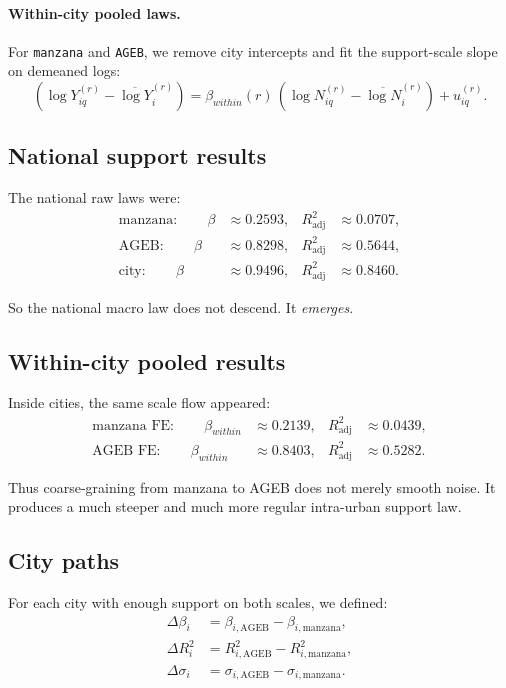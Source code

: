 \documentclass[11pt]{article}
\newcommand{\adjR}{R^2_{\mathrm{adj}}}
\begin{document}
\paragraph{Within-city pooled laws.}
For \texttt{manzana} and \texttt{AGEB}, we remove city intercepts and fit the support-scale slope on demeaned logs:
\begin{equation}
(\log Y_{iq}^{(r)}-\overline{\log Y}_{i}^{(r)})
=
\beta_{within}(r)\,(\log N_{iq}^{(r)}-\overline{\log N}_{i}^{(r)}) + u_{iq}^{(r)}.
\end{equation}

\subsection{National support results}

The national raw laws were:
\begin{align}
\text{manzana}: \qquad
\beta &\approx 0.2593,
&
\adjR &\approx 0.0707,
\\
\text{AGEB}: \qquad
\beta &\approx 0.8298,
&
\adjR &\approx 0.5644,
\\
\text{city}: \qquad
\beta &\approx 0.9496,
&
\adjR &\approx 0.8460.
\end{align}

So the national macro law does not descend. It \emph{emerges}.

\subsection{Within-city pooled results}

Inside cities, the same scale flow appeared:
\begin{align}
\text{manzana FE}: \qquad
\beta_{within} &\approx 0.2139,
&
\adjR &\approx 0.0439,
\\
\text{AGEB FE}: \qquad
\beta_{within} &\approx 0.8403,
&
\adjR &\approx 0.5282.
\end{align}

Thus coarse-graining from manzana to AGEB does not merely smooth noise. It produces a much steeper and much more regular intra-urban support law.

\subsection{City paths}

For each city with enough support on both scales, we defined:
\begin{align}
\Delta \beta_i &= \beta_{i,\mathrm{AGEB}} - \beta_{i,\mathrm{manzana}},\\
\Delta R_i^2 &= R^2_{i,\mathrm{AGEB}} - R^2_{i,\mathrm{manzana}},\\
\Delta \sigma_i &= \sigma_{i,\mathrm{AGEB}} - \sigma_{i,\mathrm{manzana}}.
\end{align}
\end{document}
